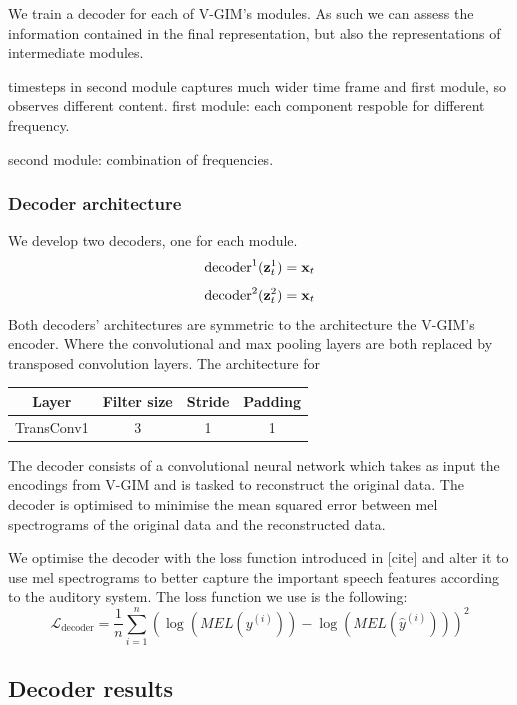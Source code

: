 		We train a decoder for each of V-GIM's modules. As such we can assess the information contained in the final representation, but also the representations of intermediate modules.
		
		timesteps in second module captures much wider time frame and first module, so observes different content.
		first module: each component respoble for different frequency.
		
		second module:
		combination of frequencies.
		
		\subsubsection{Decoder architecture}
		We develop two decoders, one for each module. 
		$$
			\text{decoder}^1(\mathbf{z}_t^1) = \mathbf{x}_t
		$$
		$$
			\text{decoder}^2(\mathbf{z}_t^2) = \mathbf{x}_t
		$$
		Both decoders' architectures are symmetric to the architecture the V-GIM's encoder. Where the convolutional and max pooling layers are both replaced by transposed convolution layers.
		The architecture for 
		
		\begin{tabular}{|c|c|c|c|}
			\hline
			Layer & Filter size & Stride & Padding \\
			\hline
			TransConv1 & 3 & 1 & 1 \\
			\hline
		\end{tabular}
	
	
	
		The decoder consists of a convolutional neural network which takes as input the encodings from V-GIM and is tasked to reconstruct the original data. The decoder is optimised to minimise the mean squared error between mel spectrograms of the original data and the reconstructed data. 
		
		We optimise the decoder with the loss function introduced in [cite] and alter it to use mel spectrograms to better capture the important speech features according to the auditory system. The loss function we use is the following:
		$$
		\mathcal{L}_{\text{decoder}} =\frac{1}{n} \sum_{i=1}^n\left( \log (MEL(y^{(i)})) -\log (MEL(\hat{y} ^{(i)} )) \right)^2
		$$
		
		
		\subsection{Decoder results}
		
		
		
	
	
	
	
